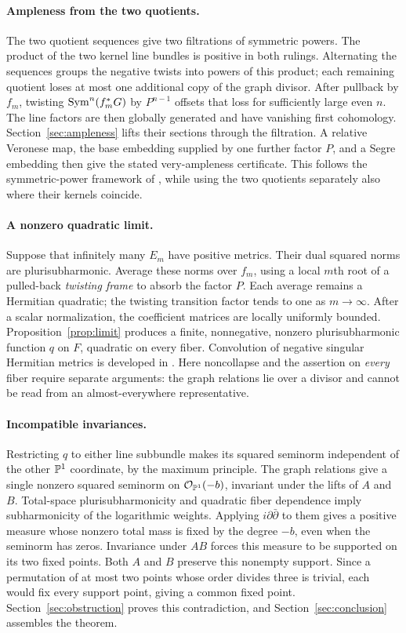 \paragraph{Ampleness from the two quotients.}
The two quotient sequences give two filtrations of symmetric powers.
The product of the two kernel line bundles is positive in both rulings.
Alternating the sequences groups the negative twists into powers of
this product; each remaining quotient loses at most one additional
copy of the graph divisor. After pullback by $f_m$, twisting
$\operatorname{Sym}^n(f_m^*G)$ by $P^{n-1}$ offsets that loss for sufficiently
large even $n$.
The line factors are then globally generated and have
vanishing first cohomology. Section~\ref{sec:ampleness} lifts their
sections through the filtration. A relative Veronese map, the base
embedding supplied by one further factor $P$, and a Segre embedding
then give the stated very-ampleness certificate. This
follows the symmetric-power framework of \cite{Hartshorne1966},
while using the two quotients separately also where their kernels
coincide.

\paragraph{A nonzero quadratic limit.}
Suppose that infinitely many $E_m$ have positive metrics. Their dual
squared norms are plurisubharmonic. Average these norms over $f_m$,
using a local $m$th root of a pulled-back \emph{twisting frame} to
absorb the factor $P$. Each average remains a Hermitian quadratic;
the twisting transition factor tends to one as $m\to\infty$.
After a scalar normalization, the coefficient matrices are locally
uniformly bounded. Proposition~\ref{prop:limit} produces a finite,
nonnegative, nonzero plurisubharmonic function $q$ on $F$, quadratic
on every fiber. Convolution of negative singular Hermitian metrics is
developed
in \cite{BerndtssonPaun2008,Raufi2015,PaunTakayama2018}.
Here noncollapse and the assertion on \emph{every} fiber require
separate arguments: the graph relations lie over a divisor and
cannot be read from an almost-everywhere representative.

\paragraph{Incompatible invariances.}
Restricting $q$ to either line subbundle makes its squared seminorm
independent of the other $\mathbb P^1$ coordinate, by the maximum principle.
The graph relations give a single nonzero squared seminorm on
$\mathcal O_{\mathbb P^1}(-b)$, invariant under the lifts of $A$ and $B$.
Total-space plurisubharmonicity and quadratic fiber dependence imply
subharmonicity of the logarithmic weights. Applying
$i\partial\bar\partial$ to them gives a positive measure whose
nonzero total mass is fixed by the degree
$-b$, even when the seminorm has zeros.
Invariance under $AB$ forces this measure to be supported on its
two fixed points. Both $A$ and $B$ preserve this nonempty support.
Since a permutation of at most two points whose order divides three
is trivial, each would fix every support point, giving a common fixed
point. Section~\ref{sec:obstruction} proves this
contradiction, and Section~\ref{sec:conclusion} assembles the theorem.

